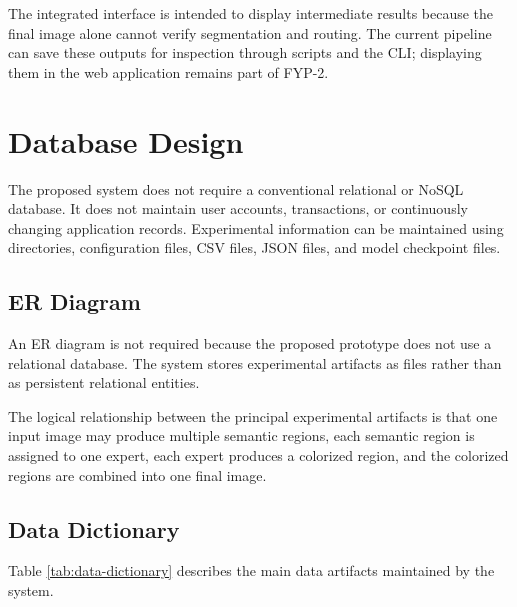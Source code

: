 \documentclass{FastFyp}
\begin{document}
The integrated interface is intended to display intermediate results because the final image alone cannot verify segmentation and routing. The current pipeline can save these outputs for inspection through scripts and the CLI; displaying them in the web application remains part of FYP-2.

\FloatBarrier
\section{Database Design}

The proposed system does not require a conventional relational or NoSQL database. It does not maintain user accounts, transactions, or continuously changing application records. Experimental information can be maintained using directories, configuration files, CSV files, JSON files, and model checkpoint files.

\subsection{ER Diagram}

An ER diagram is not required because the proposed prototype does not use a relational database. The system stores experimental artifacts as files rather than as persistent relational entities.

The logical relationship between the principal experimental artifacts is that one input image may produce multiple semantic regions, each semantic region is assigned to one expert, each expert produces a colorized region, and the colorized regions are combined into one final image.

\subsection{Data Dictionary}

Table \ref{tab:data-dictionary} describes the main data artifacts maintained by the system.
\end{document}
